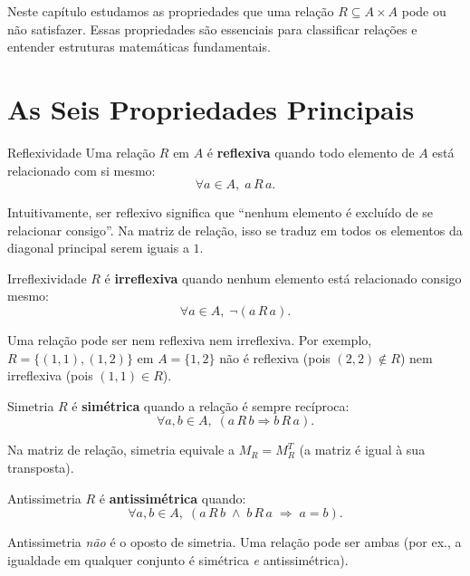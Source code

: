 \documentclass[12pt,a4paper]{book}
\begin{document}
Neste capítulo estudamos as propriedades que uma relação $R \subseteq A \times A$ pode ou não satisfazer. Essas propriedades são essenciais para classificar relações e entender estruturas matemáticas fundamentais.

\section{As Seis Propriedades Principais}

\begin{definicao}{Reflexividade}{}
Uma relação $R$ em $A$ é \textbf{reflexiva} quando todo elemento de $A$ está relacionado com si mesmo:
\[
  \forall a \in A,\; a\,R\,a.
\]
\end{definicao}

Intuitivamente, ser reflexivo significa que ``nenhum elemento é excluído de se relacionar consigo''. Na matriz de relação, isso se traduz em todos os elementos da diagonal principal serem iguais a $1$.

\begin{definicao}{Irreflexividade}{}
$R$ é \textbf{irreflexiva} quando nenhum elemento está relacionado consigo mesmo:
\[
  \forall a \in A,\; \neg(a\,R\,a).
\]
\end{definicao}

\begin{observacao}{}{}
Uma relação pode ser nem reflexiva nem irreflexiva. Por exemplo, $R = \{(1,1),(1,2)\}$ em $A = \{1,2\}$ não é reflexiva (pois $(2,2)\notin R$) nem irreflexiva (pois $(1,1)\in R$).
\end{observacao}

\begin{definicao}{Simetria}{}
$R$ é \textbf{simétrica} quando a relação é sempre recíproca:
\[
  \forall a,b \in A,\; (a\,R\,b \Rightarrow b\,R\,a).
\]
\end{definicao}

Na matriz de relação, simetria equivale a $M_R = M_R^T$ (a matriz é igual à sua transposta).

\begin{definicao}{Antissimetria}{}
$R$ é \textbf{antissimétrica} quando:
\[
  \forall a,b \in A,\; (a\,R\,b \;\land\; b\,R\,a \;\Rightarrow\; a = b).
\]
\end{definicao}

Antissimetria \emph{não} é o oposto de simetria. Uma relação pode ser ambas (por ex., a igualdade em qualquer conjunto é simétrica \emph{e} antissimétrica).
\end{document}
